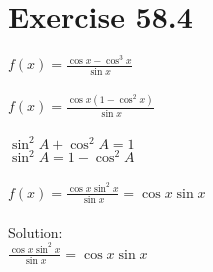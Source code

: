 \documentclass[a4paper, 10pt]{scrartcl}
\begin{document}
\section{Exercise 58.4}

$f(x) = \frac{\cos{x} - \cos^{3}{x}}{\sin{x}}$\\
\\
$f(x) = \frac{\cos{x}(1 - \cos^{2}{x})}{\sin{x}}$\\
\\
$\sin^{2}{A} + \cos^{2}{A} = 1$\\
$\sin^{2}{A} = 1 - \cos^{2}{A}$\\
\\
$f(x) = \frac{\cos{x} \sin^{2}{x}}{\sin{x}} = \cos{x} \sin{x}$\\
\\
Solution:\\
$\frac{\cos{x} \sin^{2}{x}}{\sin{x}} = \cos{x} \sin{x}$\\
\end{document}
